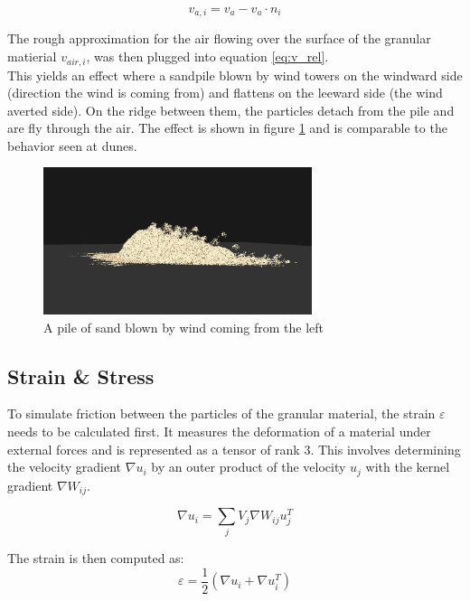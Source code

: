 \documentclass[intern]{cgMA}
\begin{document}
    \begin{equation}
        v_{a, i} = v_{a} - v_{a} \cdot n_i
    \end{equation}

    The rough approximation for the air flowing over the surface of the granular matierial $v_{air, i}$, was then plugged into equation \ref{eq:v_rel}. \\
    This yields an effect where a sandpile blown by wind towers on the windward side (direction the wind is coming from) and flattens on the leeward side (the wind averted side). On the ridge between them, the particles detach from the pile and are fly through the air. The effect is shown in figure \ref{fig:blow} and is comparable to the behavior seen at dunes.

    \begin{figure}[H]
        \centering
        \includegraphics[width=0.7\textwidth]{figures/wind_blown_pile.png}
        \caption[A pile of sand blown by wind coming from the left]{A pile of sand blown by wind coming from the left}
        \label{fig:blow}
    \end{figure}


    \subsection{Strain \& Stress}
    
    To simulate friction between the particles of the granular material, the strain $\varepsilon$ needs to be calculated first. It measures the deformation of a material under external forces and is represented as a tensor of rank 3. This involves determining the velocity gradient $\nabla u_i$ by an outer product of the velocity $u_j$ with the kernel gradient $\nabla W_{ij}$. 
    
    \begin{equation}
        \nabla u_i = \sum_j V_j \nabla W_{ij} u_j^T
    \end{equation}

    The strain is then computed as:
    \begin{equation}
        \varepsilon = \frac{1}{2} (\nabla u_i + \nabla u_i^T)
    \end{equation}
\end{document}
